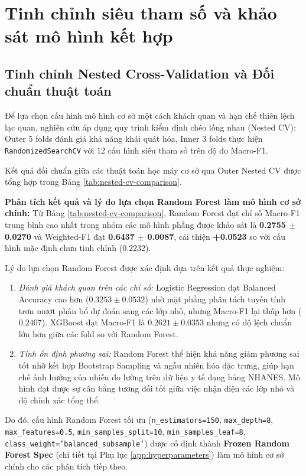 \section{Tinh chỉnh siêu tham số và khảo sát mô hình kết hợp}
\label{sec:tuning-va-ensemble}

\subsection{Tinh chỉnh Nested Cross-Validation và Đối chuẩn thuật toán}
Để lựa chọn cấu hình mô hình cơ sở một cách khách quan và hạn chế thiên lệch lạc quan, nghiên cứu áp dụng quy trình kiểm định chéo lồng nhau (Nested CV): Outer 5 folds đánh giá khả năng khái quát hóa, Inner 3 folds thực hiện \texttt{RandomizedSearchCV} với 12 cấu hình siêu tham số trên độ đo Macro-F1.

Kết quả đối chuẩn giữa các thuật toán học máy cơ sở qua Outer Nested CV được tổng hợp trong Bảng \ref{tab:nested-cv-comparison}.



\textbf{Phân tích kết quả và lý do lựa chọn Random Forest làm mô hình cơ sở chính:}
Từ Bảng \ref{tab:nested-cv-comparison}, Random Forest đạt chỉ số Macro-F1 trung bình cao nhất trong nhóm các mô hình phẳng được khảo sát là \textbf{0.2755 $\pm$ 0.0270} và Weighted-F1 đạt \textbf{0.6437 $\pm$ 0.0087}, cải thiện \textbf{+0.0523} so với cấu hình mặc định chưa tinh chỉnh ($0.2232$).

Lý do lựa chọn Random Forest được xác định dựa trên kết quả thực nghiệm:
\begin{enumerate}
    \item \textit{Đánh giá khách quan trên các chỉ số:} Logistic Regression đạt Balanced Accuracy cao hơn ($0.3253 \pm 0.0532$) nhờ mặt phẳng phân tách tuyến tính trơn mượt phân bổ dự đoán sang các lớp nhỏ, nhưng Macro-F1 lại thấp hơn ($0.2407$). XGBoost đạt Macro-F1 là $0.2621 \pm 0.0353$ nhưng có độ lệch chuẩn lớn hơn giữa các fold so với Random Forest.
    \item \textit{Tính ổn định phương sai:} Random Forest thể hiện khả năng giảm phương sai tốt nhờ kết hợp Bootstrap Sampling và ngẫu nhiên hóa đặc trưng, giúp hạn chế ảnh hưởng của nhiễu đo lường trên dữ liệu y tế dạng bảng NHANES. Mô hình đạt được sự cân bằng tương đối tốt giữa việc nhận diện các lớp nhỏ và độ chính xác tổng thể.
\end{enumerate}

Do đó, cấu hình Random Forest tối ưu (\texttt{n\_estimators=150}, \texttt{max\_depth=8}, \texttt{max\_features=0.5}, \texttt{min\_samples\_split=10}, \texttt{min\_samples\_leaf=8}, \texttt{class\_weight='balanced\_subsample'}) được cố định thành \textbf{Frozen Random Forest Spec} (chi tiết tại Phụ lục \ref{app:hyperparameters}) làm mô hình cơ sở chính cho các phân tích tiếp theo.

